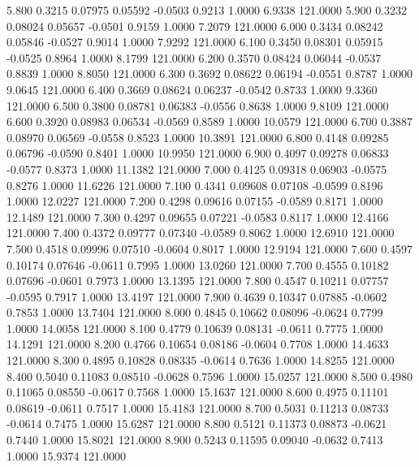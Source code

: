    5.800   0.3215   0.07975   0.05592  -0.0503   0.9213   1.0000   6.9338 121.0000
   5.900   0.3232   0.08024   0.05657  -0.0501   0.9159   1.0000   7.2079 121.0000
   6.000   0.3434   0.08242   0.05846  -0.0527   0.9014   1.0000   7.9292 121.0000
   6.100   0.3450   0.08301   0.05915  -0.0525   0.8964   1.0000   8.1799 121.0000
   6.200   0.3570   0.08424   0.06044  -0.0537   0.8839   1.0000   8.8050 121.0000
   6.300   0.3692   0.08622   0.06194  -0.0551   0.8787   1.0000   9.0645 121.0000
   6.400   0.3669   0.08624   0.06237  -0.0542   0.8733   1.0000   9.3360 121.0000
   6.500   0.3800   0.08781   0.06383  -0.0556   0.8638   1.0000   9.8109 121.0000
   6.600   0.3920   0.08983   0.06534  -0.0569   0.8589   1.0000  10.0579 121.0000
   6.700   0.3887   0.08970   0.06569  -0.0558   0.8523   1.0000  10.3891 121.0000
   6.800   0.4148   0.09285   0.06796  -0.0590   0.8401   1.0000  10.9950 121.0000
   6.900   0.4097   0.09278   0.06833  -0.0577   0.8373   1.0000  11.1382 121.0000
   7.000   0.4125   0.09318   0.06903  -0.0575   0.8276   1.0000  11.6226 121.0000
   7.100   0.4341   0.09608   0.07108  -0.0599   0.8196   1.0000  12.0227 121.0000
   7.200   0.4298   0.09616   0.07155  -0.0589   0.8171   1.0000  12.1489 121.0000
   7.300   0.4297   0.09655   0.07221  -0.0583   0.8117   1.0000  12.4166 121.0000
   7.400   0.4372   0.09777   0.07340  -0.0589   0.8062   1.0000  12.6910 121.0000
   7.500   0.4518   0.09996   0.07510  -0.0604   0.8017   1.0000  12.9194 121.0000
   7.600   0.4597   0.10174   0.07646  -0.0611   0.7995   1.0000  13.0260 121.0000
   7.700   0.4555   0.10182   0.07696  -0.0601   0.7973   1.0000  13.1395 121.0000
   7.800   0.4547   0.10211   0.07757  -0.0595   0.7917   1.0000  13.4197 121.0000
   7.900   0.4639   0.10347   0.07885  -0.0602   0.7853   1.0000  13.7404 121.0000
   8.000   0.4845   0.10662   0.08096  -0.0624   0.7799   1.0000  14.0058 121.0000
   8.100   0.4779   0.10639   0.08131  -0.0611   0.7775   1.0000  14.1291 121.0000
   8.200   0.4766   0.10654   0.08186  -0.0604   0.7708   1.0000  14.4633 121.0000
   8.300   0.4895   0.10828   0.08335  -0.0614   0.7636   1.0000  14.8255 121.0000
   8.400   0.5040   0.11083   0.08510  -0.0628   0.7596   1.0000  15.0257 121.0000
   8.500   0.4980   0.11065   0.08550  -0.0617   0.7568   1.0000  15.1637 121.0000
   8.600   0.4975   0.11101   0.08619  -0.0611   0.7517   1.0000  15.4183 121.0000
   8.700   0.5031   0.11213   0.08733  -0.0614   0.7475   1.0000  15.6287 121.0000
   8.800   0.5121   0.11373   0.08873  -0.0621   0.7440   1.0000  15.8021 121.0000
   8.900   0.5243   0.11595   0.09040  -0.0632   0.7413   1.0000  15.9374 121.0000

